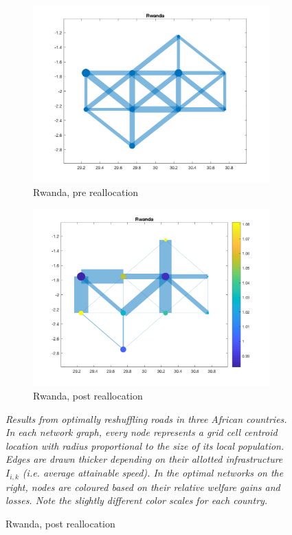 \documentclass[11pt, oneside]{article}   	%
\newcommand{\mysubcaption}[1]{
\justify
\begin{spacing}{0.7}
\textit{\footnotesize #1}
\end{spacing}}
\begin{document}
\begin{figure}[!p]
\begin{subfigure}[c]{0.45\textwidth}
\includegraphics[width=\textwidth, trim={2cm 0cm 1.5cm 0cm},clip]{../../Build/output/Matlab_graphs/Nicer_graphs/Rwanda_stat.png}
\caption{Rwanda, pre reallocation}
\label{fig:rwanda_pre}
\end{subfigure}
\begin{subfigure}[c]{0.45\textwidth}
\includegraphics[width=\textwidth, trim={2cm 0cm 1.5cm 0cm},clip]{../../Build/output/Matlab_graphs/Nicer_graphs/Rwanda_opt.png}
\caption{Rwanda, post reallocation}
\label{fig:rwanda_post}
\end{subfigure}

\mysubcaption{Results from optimally reshuffling roads in three African countries. In each network graph, every node represents a grid cell centroid location with radius proportional to the size of its local population. Edges are drawn thicker depending on their allotted infrastructure $I_{i,k}$ (i.e. average attainable speed). In the optimal networks on the right, nodes are coloured based on their relative welfare gains and losses. Note the slightly different color scales for each country.}
\label{fig:Reallocations}
\end{figure}
\end{document}
